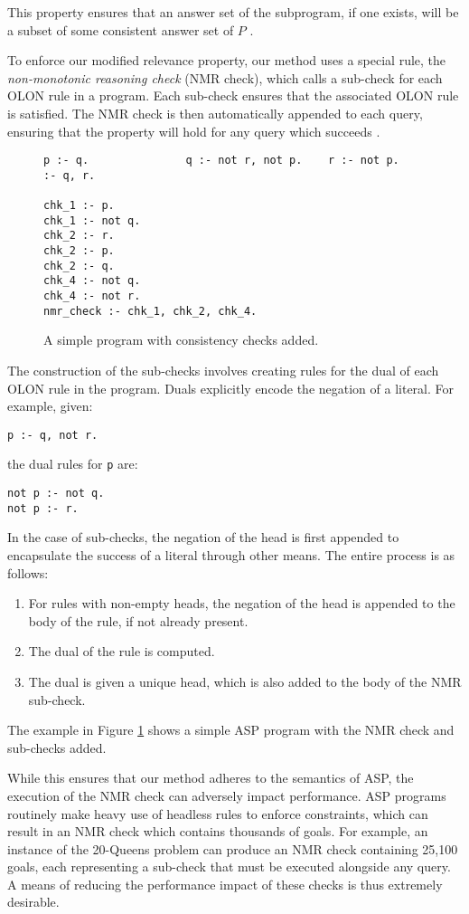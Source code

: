\documentclass{new_tlp}
\begin{document}
\noindent This property ensures that an answer set of the subprogram, if one
exists, will be a subset of some consistent answer set of $P$ \cite{goalasp}.

To enforce our modified relevance property, our method uses a special rule, the
\textit{non-monotonic reasoning check} (NMR check), which calls a sub-check for
each OLON rule in a program. Each sub-check ensures that the associated OLON
rule is satisfied. The NMR check is then automatically appended to each query,
ensuring that the property will hold for any query which succeeds
\cite{goalasp}.

\begin{figure}
\figrule
\begin{verbatim}
p :- q.               q :- not r, not p.    r :- not p.           :- q, r.              

chk_1 :- p.
chk_1 :- not q.
chk_2 :- r.
chk_2 :- p.
chk_2 :- q.
chk_4 :- not q.
chk_4 :- not r.
nmr_check :- chk_1, chk_2, chk_4.
\end{verbatim}
\caption{A simple program with consistency checks added.} \label{fig:nmrexample}
\figrule
\end{figure}

The construction of the sub-checks involves creating rules for the dual of each 
OLON rule in the program. Duals explicitly encode the negation of a literal.
For example, given:
\begin{verbatim}
p :- q, not r.
\end{verbatim}
\noindent the dual rules for \texttt{p} are:
\begin{verbatim}
not p :- not q.
not p :- r.
\end{verbatim}
\noindent In the case of sub-checks, the negation of the head is first appended 
to encapsulate the success of a literal through other means. The entire process 
is as follows:
\begin{enumerate}
\item For rules with non-empty heads, the negation of the head is appended to 
	the body of the rule, if not already present.
\item The dual of the rule is computed.
\item The dual is given a unique head, which is also added to the body of the 
	NMR sub-check.
\end{enumerate}
The example in Figure \ref{fig:nmrexample} shows a simple ASP program with the 
NMR check and sub-checks added.

While this ensures that our method adheres to the semantics of ASP, the
execution of the NMR check can adversely impact performance. ASP programs
routinely make heavy use of headless rules to enforce constraints, which can
result in an NMR check which contains thousands of goals. For example, an
instance of the 20-Queens problem can produce an NMR check containing 25,100
goals, each representing a sub-check that must be executed alongside any query.
A means of reducing the performance impact of these checks is thus extremely
desirable.
\end{document}
